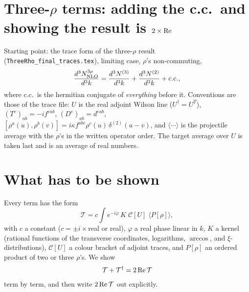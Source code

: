 \documentclass[10pt]{article}
\begin{document}
\section*{Three-$\rho$ terms: adding the c.c.\ and showing the result is $2\times{\rm Re}$}
\noindent Starting point: the trace form of the three-$\rho$ result (\texttt{ThreeRho\_final\_traces.tex}), limiting case, $\rho$'s non-commuting,
\begin{equation}
\frac{d^{3}N^{3\rho}_{\rm NLO}}{d^{3}k}=\frac{d^{3}N^{(3)}}{d^{3}k}+\frac{d^{3}N^{(2)}}{d^{3}k}+{\rm c.c.},
\end{equation}
where c.c.\ is the hermitian conjugate of \emph{everything} before it. Conventions are those of the trace file: $U$ is the real adjoint Wilson line ($U^{\dagger}=U^{T}$), $(T^{e})_{ab}=-if^{eab}$, $(D^{e})_{ab}=d^{eab}$, $[\rho^{a}(u),\rho^{b}(v)]=i\kappa f^{abc}\rho^{c}(u)\,\delta^{(2)}(u-v)$, and $\langle\cdots\rangle$ is the projectile average with the $\rho$'s in the written operator order. The target average over $U$ is taken last and is an average of real numbers.

\section{What has to be shown}
Every term has the form
\begin{equation}
\mathcal{T}=c\int e^{-i\varphi}\,K\;\mathcal{C}[U]\;\big\langle P[\rho]\big\rangle ,\label{eq:T}
\end{equation}
with $c$ a constant ($c=\pm i\times$real or real), $\varphi$ a real phase linear in $k$, $K$ a kernel (rational functions of the transverse coordinates, logarithms, $\arccos$, and $\xi$-distributions), $\mathcal{C}[U]$ a colour bracket of adjoint traces, and $P[\rho]$ an ordered product of two or three $\rho$'s. We show
\begin{equation}
\mathcal{T}+\mathcal{T}^{\dagger}=2\,{\rm Re}\,\mathcal{T}
\end{equation}
term by term, and then write $2\,{\rm Re}\,\mathcal{T}$ out explicitly.
\end{document}
